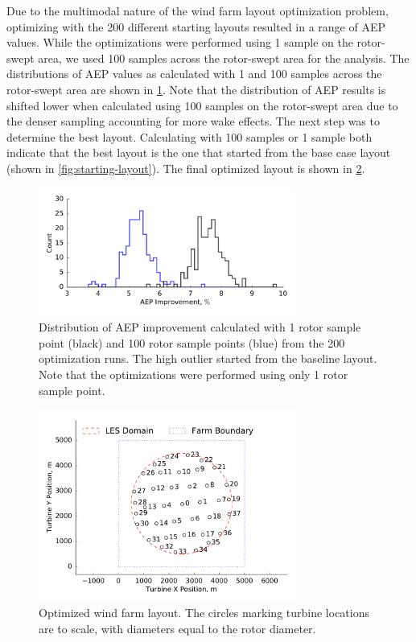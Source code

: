 \documentclass[conf]{new-aiaa}
\begin{document}
Due to the multimodal nature of the wind farm layout optimization problem, optimizing with the 200 different starting layouts resulted in a range of AEP values. While the optimizations were performed using 1 sample on the rotor-swept area, we used 100 samples across the rotor-swept area for the analysis. The distributions of AEP values as calculated with 1 and 100 samples across the rotor-swept area are shown in \cref{fig:opt-distribution}. Note that the distribution of AEP results is shifted lower when calculated using 100 samples on the rotor-swept area due to the denser sampling accounting for more wake effects. The next step was to determine the best layout. Calculating with 100 samples or 1 sample both indicate that the best layout is the one that started from the base case layout (shown in \cref{fig:starting-layout}). The final optimized layout is shown in \cref{fig:optimized-layout}.
%
\begin{figure}[htpb!]
	\centering
	\includegraphics[width=0.75\textwidth]{final_images/38turbs_results_hist_aep.pdf}
	\caption{Distribution of AEP improvement calculated with 1 rotor sample point (black) and 100 rotor sample points (blue) from the 200 optimization runs. The high outlier started from the baseline layout. Note that the optimizations were performed using only 1 rotor sample point.}
	\label{fig:opt-distribution}
\end{figure}
%
\begin{figure}[htpb!]
	\centering
	\includegraphics[width=0.75\textwidth]{final_images/round_farm_38Turbines_5DSpacing_finish.pdf}
	\caption{Optimized wind farm layout. The circles marking turbine locations are to scale, with diameters equal to the rotor diameter.}
	\label{fig:optimized-layout}
\end{figure}
\end{document}
